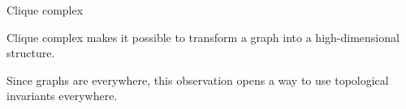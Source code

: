 \documentclass[10pt]{beamer}
\DeclareMathOperator{\id}{id}
\newcommand{\Ro}{\mathbb{R}}
\begin{document}
\begin{frame}{Clique complex}

Clique complex makes it possible to transform a graph into a high-dimensional structure. 

Since graphs are everywhere, this observation opens a way to use topological invariants everywhere.   

\end{frame}
%
%
%
%
%
%
%
%
%
%
%
\end{document}
